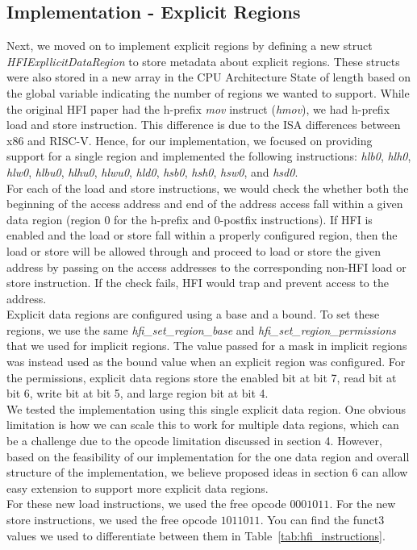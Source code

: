 \documentclass[conference,compsoc]{IEEEtran}
\begin{document}
\subsection{Implementation - Explicit Regions}
Next, we moved on to implement explicit regions by defining a new struct \textit{HFIExpllicitDataRegion} to store metadata about explicit regions. These structs were also stored in a new array in the CPU Architecture State of length based on the global variable indicating the number of regions we wanted to support. While the original HFI paper had the h-prefix \textit{mov} instruct (\textit{hmov}), we had h-prefix load and store instruction. This difference is due to the ISA differences between x86 and RISC-V. Hence, for our implementation, we focused on providing support for a single region and implemented the following instructions: \textit{hlb0}, \textit{hlh0}, \textit{hlw0}, \textit{hlbu0}, \textit{hlhu0}, \textit{hlwu0}, \textit{hld0}, \textit{hsb0}, \textit{hsh0}, \textit{hsw0}, and \textit{hsd0}.\\
For each of the load and store instructions, we would check the whether both the beginning of the access address and end of the address access fall within a given data region (region 0 for the h-prefix and 0-postfix instructions). If HFI is enabled and the load or store fall within a properly configured region, then the load or store will be allowed through and proceed to load or store the given address by passing on the access addresses to the corresponding non-HFI load or store instruction. If the check fails, HFI would trap and prevent access to the address.\\
Explicit data regions are configured using a base and a bound. To set these regions, we use the same \textit{hfi\_set\_region\_base} and \textit{hfi\_set\_region\_permissions} that we used for implicit regions. The value passed for a mask in implicit regions was instead used as the bound value when an explicit region was configured. For the permissions, explicit data regions store the enabled bit at bit 7, read bit at bit 6, write bit at bit 5, and large region bit at bit 4.\\
We tested the implementation using this single explicit data region. One obvious limitation is how we can scale this to work for multiple data regions, which can be a challenge due to the opcode limitation discussed in section 4. However, based on the feasibility of our implementation for the one data region and overall structure of the implementation, we believe proposed ideas in section 6 can allow easy extension to support more explicit data regions.\\
For these new load instructions, we used the free opcode $0001011$. For the new store instructions, we used the free opcode $1011011$. You can find the funct3 values we used to differentiate between them in Table~\ref{tab:hfi_instructions}.
\end{document}
